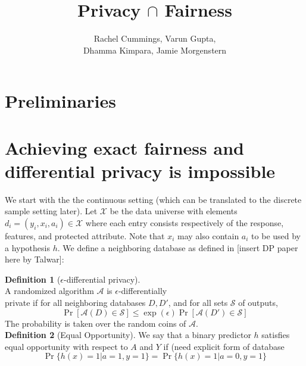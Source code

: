 \documentclass[runningheads]{article}
\newcommand{\A}{\mathcal{A}}
\renewcommand{\H}{\mathcal{H}}
\newcommand{\1}{\mathbbm{1}}
\renewcommand{\S}{\mathcal{S}}
\theoremstyle{definition}
\begin{document}

\title{Privacy $\cap$ Fairness}
{\author{Rachel Cummings, Varun Gupta, \\Dhamma Kimpara, Jamie Morgenstern}}
\maketitle
\section{Preliminaries}




\section{Achieving exact fairness and differential privacy is impossible}
We start with the the continuous setting (which can be translated to the discrete sample setting later). Let $\mathcal{X}$ be the data universe with elements $d_i = (y_i,x_i,a_i) \in \mathcal{X}$ where each entry consists respectively of the response, features, and protected attribute. Note that $x_i$ may also contain $a_i$ to be used by a hypothesis $h$. We define a neighboring database as defined in [insert DP paper here by Talwar]:

{\bf Definition 1} ($\epsilon$-differential privacy). \\
A randomized algorithm $\A$ is $\epsilon$-differentially \\private if for all neighboring databases $D, D'$, and for all sets $\S$ of outputs,
$$\Pr[\A(D)\in \S] \leq \exp(\epsilon)\Pr[\A(D')\in \S]$$
The probability is taken over the random coins of $\A$.\\
{\bf Definition 2} (Equal Opportunity). We say that a binary predictor $h$ satisfies equal opportunity with respect to $A$ and $Y$ if (need explicit form of database
$$\Pr\{h(x) = 1 | a = 1, y = 1\} = \Pr\{h(x) = 1 | a=0, y=1\}$$
\end{document}
